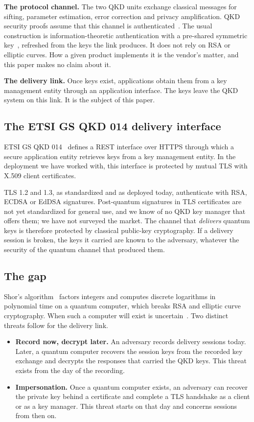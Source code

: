 \documentclass[11pt,letterpaper]{article}
\begin{document}
\textbf{The protocol channel.} The two QKD units exchange classical messages for sifting, parameter estimation, error correction and privacy amplification. QKD security proofs assume that this channel is authenticated~\cite{scarani2009security}. The usual construction is information-theoretic authentication with a pre-shared symmetric key~\cite{wegman1981new}, refreshed from the keys the link produces. It does not rely on RSA or elliptic curves. How a given product implements it is the vendor's matter, and this paper makes no claim about it.

\textbf{The delivery link.} Once keys exist, applications obtain them from a key management entity through an application interface. The keys leave the QKD system on this link. It is the subject of this paper.

\subsection{The ETSI GS QKD 014 delivery interface}

ETSI GS QKD 014~\cite{etsi2019qkd} defines a REST interface over HTTPS through which a secure application entity retrieves keys from a key management entity. In the deployment we have worked with, this interface is protected by mutual TLS with X.509 client certificates.

TLS 1.2 and 1.3, as standardized and as deployed today, authenticate with RSA, ECDSA or EdDSA signatures. Post-quantum signatures in TLS certificates are not yet standardized for general use, and we know of no QKD key manager that offers them; we have not surveyed the market. The channel that \textit{delivers} quantum keys is therefore protected by classical public-key cryptography. If a delivery session is broken, the keys it carried are known to the adversary, whatever the security of the quantum channel that produced them.

\subsection{The gap}

Shor's algorithm~\cite{shor1997polynomial} factors integers and computes discrete logarithms in polynomial time on a quantum computer, which breaks RSA and elliptic curve cryptography. When such a computer will exist is uncertain~\cite{mosca2018cybersecurity}. Two distinct threats follow for the delivery link.

\begin{itemize}
    \item \textbf{Record now, decrypt later.} An adversary records delivery sessions today. Later, a quantum computer recovers the session keys from the recorded key exchange and decrypts the responses that carried the QKD keys. This threat exists from the day of the recording.
    \item \textbf{Impersonation.} Once a quantum computer exists, an adversary can recover the private key behind a certificate and complete a TLS handshake as a client or as a key manager. This threat starts on that day and concerns sessions from then on.
\end{itemize}
\end{document}
